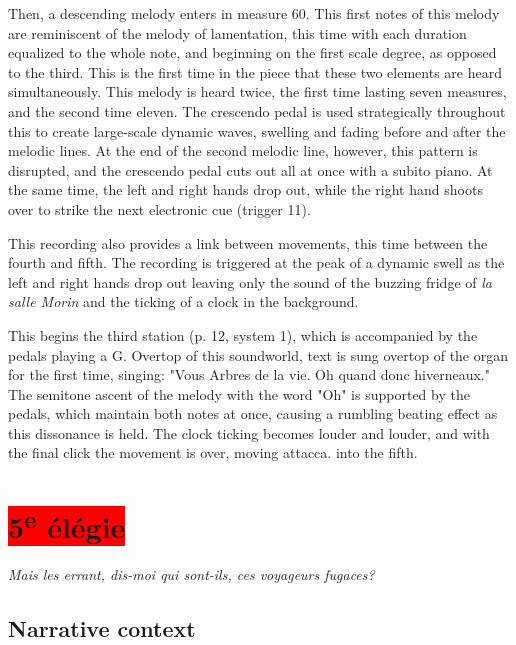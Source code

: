 \documentclass[12pt,twoside,maitrise]{dms_ks}
\theoremstyle{definition}
\begin{document}
{Then, a descending melody enters in measure 60. 
This first notes of this melody are reminiscent of the melody of lamentation, this time with each duration equalized to the whole note, and beginning on the first scale degree, as opposed to the third. 
This is the first time in the piece that these two elements are heard simultaneously. 
This melody is heard twice, the first time lasting seven measures, and the second time eleven. 
The crescendo pedal is used strategically throughout this to create large-scale dynamic waves, swelling and fading before and after the melodic lines. 
At the end of the second melodic line, however, this pattern is disrupted, and the crescendo pedal cuts out all at once with a subito piano. 
At the same time, the left and right hands drop out, while the right hand shoots over to strike the next electronic cue (trigger 11). 




This recording also provides a link between movements, this time between the fourth and fifth. 
The recording is triggered at the peak of a dynamic swell as the left and right hands drop out leaving only the sound of the buzzing fridge of \textit{la salle Morin} and the ticking of a clock in the background. 

This begins the third station (p. 12, system 1), which is accompanied by the pedals playing a G. Overtop of this soundworld, text is sung overtop of the organ for the first time, singing: "Vous Arbres de la vie. Oh quand donc hiverneaux." The semitone ascent of the melody with the word "Oh" is supported by the pedals, which maintain both notes at once, causing a rumbling beating effect as this dissonance is held. The clock ticking becomes louder and louder, and with the final click the movement is over, moving attacca. into the fifth.


\section{\colorbox{red}{5\textsuperscript{e} élégie}}

\epigraph{\textit{Mais les errant, dis-moi qui sont-ils, ces voyageurs fugaces?}}{}

\subsection{Narrative context}

}
\end{document}
